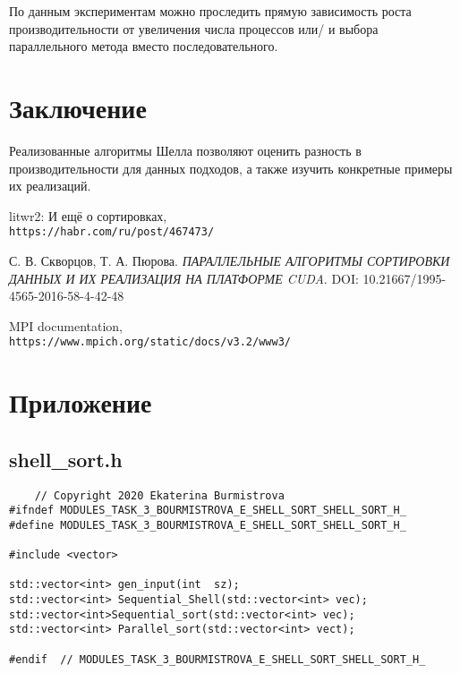 \documentclass{report}
\begin{document}
По данным экспериментам можно проследить прямую зависимость роста производительности от увеличения числа процессов или/ и выбора параллельного метода вместо последовательного.
\newpage
\section*{Заключение}
Реализованные алгоритмы Шелла позволяют оценить разность в производительности для данных подходов, а также изучить конкретные примеры их реализаций.
\newpage

\begin{thebibliography}{1}
litwr2: И ещё о сортировках,
\\\texttt{https://habr.com/ru/post/467473/}


С. В. Скворцов, Т. А. Пюрова. 
\textit{ПАРАЛЛЕЛЬНЫЕ АЛГОРИТМЫ СОРТИРОВКИ ДАННЫХ
И ИХ РЕАЛИЗАЦИЯ НА ПЛАТФОРМЕ CUDA}.
DOI: 10.21667/1995-4565-2016-58-4-42-48

MPI documentation,
\\\texttt{https://www.mpich.org/static/docs/v3.2/www3/}
\end{thebibliography}
\newpage
\section*{Приложение}
 	\subsection*{shell\_sort.h}
 	\begin{verbatim}
 	// Copyright 2020 Ekaterina Burmistrova
#ifndef MODULES_TASK_3_BOURMISTROVA_E_SHELL_SORT_SHELL_SORT_H_
#define MODULES_TASK_3_BOURMISTROVA_E_SHELL_SORT_SHELL_SORT_H_

#include <vector>

std::vector<int> gen_input(int  sz);
std::vector<int> Sequential_Shell(std::vector<int> vec);
std::vector<int>Sequential_sort(std::vector<int> vec);
std::vector<int> Parallel_sort(std::vector<int> vect);

#endif  // MODULES_TASK_3_BOURMISTROVA_E_SHELL_SORT_SHELL_SORT_H_
 	\end{verbatim}
\end{document}
